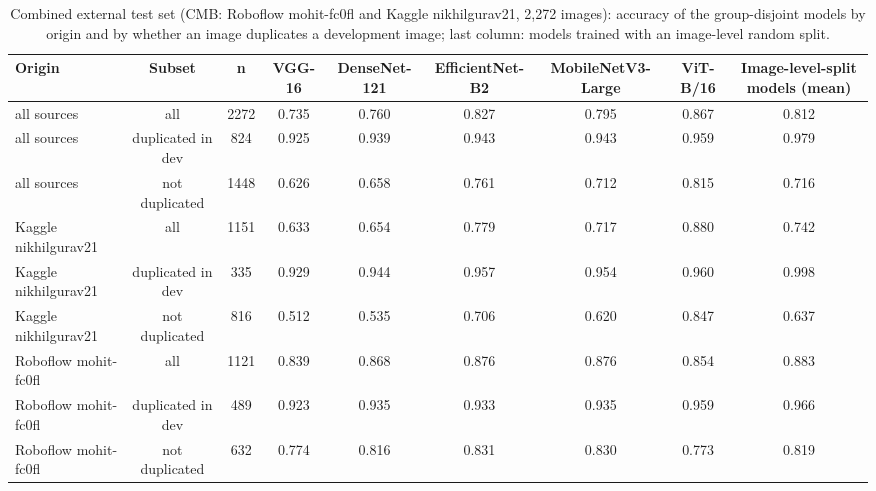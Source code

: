 \begin{table}[!tbp]
\centering
\caption{Combined external test set (CMB: Roboflow mohit-fc0fl and Kaggle nikhilgurav21, 2,272 images): accuracy of the group-disjoint models by origin and by whether an image duplicates a development image; last column: models trained with an image-level random split.}
\label{tab:legacy}
\footnotesize
\begin{tabular}{lcccccccc}
\hline
Origin & Subset & n & VGG-16 & DenseNet-121 & EfficientNet-B2 & MobileNetV3-Large & ViT-B/16 & Image-level-split models (mean) \\
\hline
all sources & all & 2272 & 0.735 & 0.760 & 0.827 & 0.795 & 0.867 & 0.812 \\
all sources & duplicated in dev & 824 & 0.925 & 0.939 & 0.943 & 0.943 & 0.959 & 0.979 \\
all sources & not duplicated & 1448 & 0.626 & 0.658 & 0.761 & 0.712 & 0.815 & 0.716 \\
Kaggle nikhilgurav21 & all & 1151 & 0.633 & 0.654 & 0.779 & 0.717 & 0.880 & 0.742 \\
Kaggle nikhilgurav21 & duplicated in dev & 335 & 0.929 & 0.944 & 0.957 & 0.954 & 0.960 & 0.998 \\
Kaggle nikhilgurav21 & not duplicated & 816 & 0.512 & 0.535 & 0.706 & 0.620 & 0.847 & 0.637 \\
Roboflow mohit-fc0fl & all & 1121 & 0.839 & 0.868 & 0.876 & 0.876 & 0.854 & 0.883 \\
Roboflow mohit-fc0fl & duplicated in dev & 489 & 0.923 & 0.935 & 0.933 & 0.935 & 0.959 & 0.966 \\
Roboflow mohit-fc0fl & not duplicated & 632 & 0.774 & 0.816 & 0.831 & 0.830 & 0.773 & 0.819 \\
\hline
\end{tabular}
\end{table}